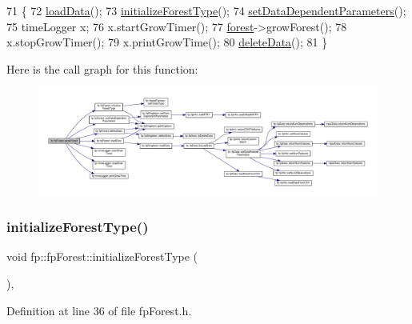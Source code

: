 \begin{DoxyCode}
71                              \{
72                 \hyperlink{classfp_1_1fpForest_a01631065f4909f10cea4b690084a345a}{loadData}();
73                 \hyperlink{classfp_1_1fpForest_a776ae408ea6c9af459e6ebba7e363d57}{initializeForestType}();
74                 \hyperlink{classfp_1_1fpForest_a846818c46a4423f668f19d3493864192}{setDataDependentParameters}();
75                 timeLogger x;
76                 x.startGrowTimer();
77                 \hyperlink{classfp_1_1fpForest_a4ce6af867d36c8d62c860db8982235c4}{forest}->growForest();
78                 x.stopGrowTimer();
79                 x.printGrowTime();
80                 \hyperlink{classfp_1_1fpForest_a598d32c816dfe5f9793973dcdff2f76e}{deleteData}();
81             \}
\end{DoxyCode}
Here is the call graph for this function\+:\nopagebreak
\begin{figure}[H]
\begin{center}
\leavevmode
\includegraphics[width=350pt]{classfp_1_1fpForest_ac617e33890e96ee5e96e286a45d245fe_cgraph}
\end{center}
\end{figure}
\mbox{\label{classfp_1_1fpForest_a776ae408ea6c9af459e6ebba7e363d57}} 
\subsubsection{\texorpdfstring{initialize\+Forest\+Type()}{initializeForestType()}}
{\footnotesize\ttfamily void fp\+::fp\+Forest\+::initialize\+Forest\+Type (\begin{DoxyParamCaption}{ }\end{DoxyParamCaption})\hspace{0.3cm}{\ttfamily [inline]}, {\ttfamily [protected]}}



Definition at line 36 of file fp\+Forest.\+h.


